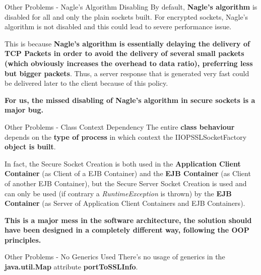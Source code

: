\documentclass{../common/latex_classes/pdf_presentation}
\begin{document}
	\begin{frame}{Other Problems - Nagle’s Algorithm Disabling}
		By default, \textbf{Nagle’s algorithm} is disabled for all and only the plain sockets built. For encrypted sockets, Nagle’s algorithm is not disabled and this could lead to severe performance issue. \par This is because \textbf{Nagle’s algorithm is essentially delaying the delivery of TCP Packets in order to avoid the delivery of several small packets (which obviously increases the overhead to data ratio), preferring less but bigger packets}. Thus, a server response that is generated very fast could be delivered later to the client because of this policy. \par \textbf{For us, the missed disabling of Nagle’s algorithm in secure sockets is a major bug.}
	\end{frame}
	
	\begin{frame}{Other Problems - Class Context Dependency}
		The entire \textbf{class behaviour} depends on the \textbf{type of process} in which context the IIOPSSLSocketFactory \textbf{object is built}. \par In fact, the Secure Socket Creation is both used in the \textbf{Application Client Container} (as Client of a EJB Container) and the \textbf{EJB Container} (as Client of another EJB Container), but the Secure Server Socket Creation is used and can only be used (if contrary a \textit{RuntimeException} is thrown) by the \textbf{EJB Container} (as Server of Application Client Containers and EJB Containers). \par \textbf{This is a major mess in the software architecture, the solution should have been designed in a completely different way, following the OOP principles.}
	\end{frame}
	
	\begin{frame}{Other Problems - No Generics Used}
		There’s no usage of generics in the \textbf{java.util.Map} attribute \textbf{portToSSLInfo}.%
	\end{frame}
\end{document}
